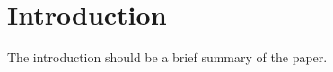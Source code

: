 \section{Introduction}
\label{sec:introduction}

The introduction should be a brief summary of the paper.
